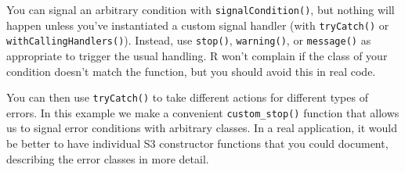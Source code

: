 You can signal an arbitrary condition with \texttt{signalCondition()},
but nothing will happen unless you've instantiated a custom signal
handler (with \texttt{tryCatch()} or \texttt{withCallingHandlers()}).
Instead, use \texttt{stop()}, \texttt{warning()}, or \texttt{message()}
as appropriate to trigger the usual handling. R won't complain if the
class of your condition doesn't match the function, but you should avoid
this in real code. 

\begin{Shaded}
\begin{Highlighting}[]
\StringTok{ }\NormalTok{(}\NormalTok{(}\NormalTok{, }\NormalTok{), }\NormalTok{)}
\end{Highlighting}
\end{Shaded}

You can then use \texttt{tryCatch()} to take different actions for
different types of errors. In this example we make a convenient
\texttt{custom\_stop()} function that allows us to signal error
conditions with arbitrary classes. In a real application, it would be
better to have individual S3 constructor functions that you could
document, describing the error classes in more detail.

\begin{Shaded}
\begin{Highlighting}[]
\StringTok{ } \NormalTok{(-}\NormalTok{), }
  \StringTok{ }\NormalTok{(} 
\NormalTok{\}}

\StringTok{ }
    \NormalTok{(}\NormalTok{, }\NormalTok{)}
  \StringTok{ }\NormalTok{))}
    \NormalTok{(}\NormalTok{, }\NormalTok{)}

\NormalTok{\}}
\NormalTok{(}
  \NormalTok{(}\NormalTok{),}
   \NormalTok{,}
   
\NormalTok{)}
\end{Highlighting}
\end{Shaded}

